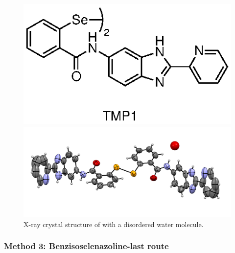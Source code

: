 \begin{refsection}
\begin{figure}
    \centering
    \includegraphics[scale=0.74]{Figures/ebs-rhs-diselenide.eps}

    \includegraphics[width=0.8\linewidth]{Figures/diselenide-benzimidazole-2py-xray.pdf}
    \caption[X-ray crystal structure of .]{X-ray crystal structure of  with a disordered water molecule.}\label{fig:diselenide-benzimidazole-2py-xray}
\end{figure}

\subsubsection{Method 3: Benzisoselenazoline-last route}


\end{refsection}
